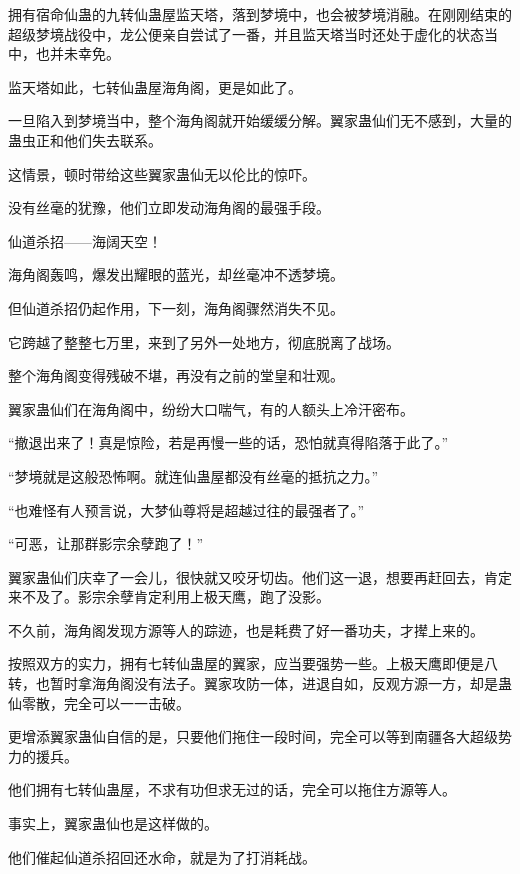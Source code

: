 
\begin{this_body}

拥有宿命仙蛊的九转仙蛊屋监天塔，落到梦境中，也会被梦境消融。在刚刚结束的超级梦境战役中，龙公便亲自尝试了一番，并且监天塔当时还处于虚化的状态当中，也并未幸免。

监天塔如此，七转仙蛊屋海角阁，更是如此了。

一旦陷入到梦境当中，整个海角阁就开始缓缓分解。翼家蛊仙们无不感到，大量的蛊虫正和他们失去联系。

这情景，顿时带给这些翼家蛊仙无以伦比的惊吓。

没有丝毫的犹豫，他们立即发动海角阁的最强手段。

仙道杀招——海阔天空！

海角阁轰鸣，爆发出耀眼的蓝光，却丝毫冲不透梦境。

但仙道杀招仍起作用，下一刻，海角阁骤然消失不见。

它跨越了整整七万里，来到了另外一处地方，彻底脱离了战场。

整个海角阁变得残破不堪，再没有之前的堂皇和壮观。

翼家蛊仙们在海角阁中，纷纷大口喘气，有的人额头上冷汗密布。

“撤退出来了！真是惊险，若是再慢一些的话，恐怕就真得陷落于此了。”

“梦境就是这般恐怖啊。就连仙蛊屋都没有丝毫的抵抗之力。”

“也难怪有人预言说，大梦仙尊将是超越过往的最强者了。”

“可恶，让那群影宗余孽跑了！”

翼家蛊仙们庆幸了一会儿，很快就又咬牙切齿。他们这一退，想要再赶回去，肯定来不及了。影宗余孽肯定利用上极天鹰，跑了没影。

不久前，海角阁发现方源等人的踪迹，也是耗费了好一番功夫，才撵上来的。

按照双方的实力，拥有七转仙蛊屋的翼家，应当要强势一些。上极天鹰即便是八转，也暂时拿海角阁没有法子。翼家攻防一体，进退自如，反观方源一方，却是蛊仙零散，完全可以一一击破。

更增添翼家蛊仙自信的是，只要他们拖住一段时间，完全可以等到南疆各大超级势力的援兵。

他们拥有七转仙蛊屋，不求有功但求无过的话，完全可以拖住方源等人。

事实上，翼家蛊仙也是这样做的。

他们催起仙道杀招回还水命，就是为了打消耗战。


\end{this_body}
